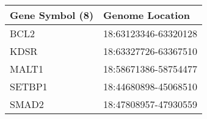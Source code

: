 \begin{tabular}{ll}
\toprule
Gene Symbol (8) &      Genome Location \\
\midrule
           BCL2 & 18:63123346-63320128 \\
           KDSR & 18:63327726-63367510 \\
          MALT1 & 18:58671386-58754477 \\
         SETBP1 & 18:44680898-45068510 \\
          SMAD2 & 18:47808957-47930559 \\
\bottomrule
\end{tabular}
